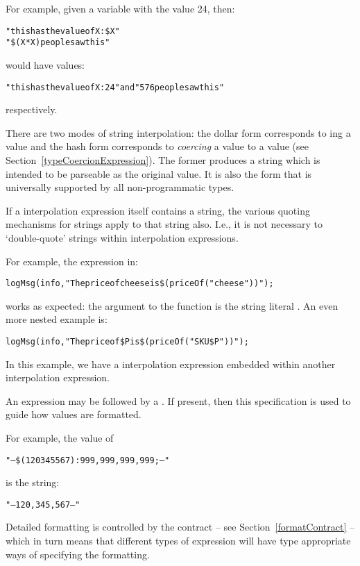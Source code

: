 For example, given a variable  with the value 24, then:
\begin{alltt}
"this has the value of X: \$X"
"\$(X*X) people saw this"
\end{alltt}
would have values:
\begin{alltt}
"this has the value of X: 24" {\rm and} "576 people saw this"
\end{alltt}
respectively.

There are two modes of string interpolation: the dollar form corresponds to ing a value and the hash form corresponds to \emph{coercing} a value to a  value (see Section~\vref{typeCoercionExpression}). The former produces a string which is intended to be parseable as the original value. It is also the form that is universally supported by all non-programmatic types.

\begin{aside}
If a  interpolation expression itself contains a string, the various quoting mechanisms for strings apply to that string also. I.e., it is not necessary to `double-quote' strings within  interpolation expressions.

For example, the  expression in:
\begin{alltt}
logMsg(info,"The price of cheese is \$(priceOf("cheese"))");
\end{alltt}
works as expected: the argument to the  function is the string literal . An even more nested example is:
\begin{alltt}
logMsg(info,"The price of \$P is \$(priceOf("SKU\$P"))");
\end{alltt}
In this example, we have a  interpolation expression embedded within another  interpolation expression.
\end{aside}

An  expression may be followed by a . If present, then this specification is used to guide how values are formatted.

For example, the value of
\begin{alltt}
"--\$(120345567):999,999,999,999;--"
\end{alltt}
is the string:
\begin{alltt}
"--120,345,567--"
\end{alltt}
Detailed formatting is controlled by the  contract -- see Section~\vref{formatContract} -- which in turn means that different types of expression will have type appropriate ways of specifying the formatting.


